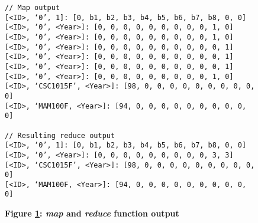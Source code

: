 \begin{figure}[H]
    \centering
    \begin{mdframed}
        \centering
        \begin{verbatim}
// Map output
[<ID>, ‘0’, 1]: [0, b1, b2, b3, b4, b5, b6, b7, b8, 0, 0]
[<ID>, ‘0’, <Year>]: [0, 0, 0, 0, 0, 0, 0, 0, 0, 1, 0]
[<ID>, ‘0’, <Year>]: [0, 0, 0, 0, 0, 0, 0, 0, 0, 1, 0]
[<ID>, ‘0’, <Year>]: [0, 0, 0, 0, 0, 0, 0, 0, 0, 0, 1]
[<ID>, ‘0’, <Year>]: [0, 0, 0, 0, 0, 0, 0, 0, 0, 0, 1]
[<ID>, ‘0’, <Year>]: [0, 0, 0, 0, 0, 0, 0, 0, 0, 0, 1]
[<ID>, ‘0’, <Year>]: [0, 0, 0, 0, 0, 0, 0, 0, 0, 1, 0]
[<ID>, ‘CSC1015F’, <Year>]: [98, 0, 0, 0, 0, 0, 0, 0, 0, 0, 0]
[<ID>, ‘MAM100F, <Year>]: [94, 0, 0, 0, 0, 0, 0, 0, 0, 0, 0]

// Resulting reduce output
[<ID>, ‘0’, 1]: [0, b1, b2, b3, b4, b5, b6, b7, b8, 0, 0]
[<ID>, ‘0’, <Year>]: [0, 0, 0, 0, 0, 0, 0, 0, 0, 3, 3]
[<ID>, ‘CSC1015F’, <Year>]: [98, 0, 0, 0, 0, 0, 0, 0, 0, 0, 0]
[<ID>, ‘MAM100F, <Year>]: [94, 0, 0, 0, 0, 0, 0, 0, 0, 0, 0]
        \end{verbatim}
    \end{mdframed}
    \caption[Aggregation By Sorted MapReduce output]{\textbf{Figure \ref{fig-mapreduce-key-output}: \textit{map} and \textit{reduce} function output}}
    \label{fig-mapreduce-key-output}
\end{figure}
